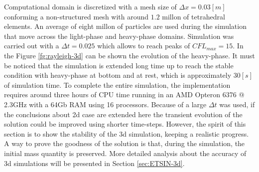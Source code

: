 Computational domain is discretized with a mesh size of $\Delta x=0.03[m]$ conforming a non-structured mesh with around $1.2$ millon of tetrahedral elements. An average of eight millon of particles are used during the simulation that move across the light-phase and heavy-phase domains. Simulation was carried out with a $\Delta t=0.025$ which allows to reach peaks of $CFL_{max}=15$. In the Figure \ref{fg:rayleigh-3d} can be shown the evolution of the heavy-phase. It must be noticed that the simulation is extended long time up to reach the stable condition with heavy-phase at bottom and at rest, which is approximately $30[s]$ of simulation time. To complete the entire simulation, the implementation requires around three hours of CPU time running in an AMD Opteron 6376 @ 2.3GHz with a 64Gb RAM using 16 processors. Because of a large $\Delta t$ was used, if the conclusions about 2d case are extended here the transient evolution of the solution could be improved using shorter time-steps. However, the spirit of this section is to show the stability of the 3d simulation, keeping a realistic progress. A way to prove the goodness of the solution is that, during the simulation, the initial mass quantity is preserved. More detailed analysis about the accuracy of 3d simulations will be presented in Section \ref{sec:ETSIN-3d}.


